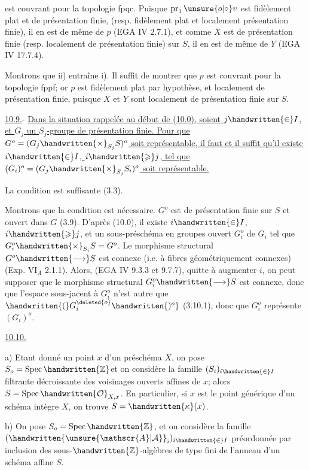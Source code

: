 est couvrant pour la topologie fpqc. Puisque $\operatorname{pr}_1\mathbin{\unsure{o|\circ}} v$ est fidèlement plat et de présentation finie, (resp. fidèlement plat et localement  présentation finie), il en est de même de $p$ (EGA IV 2.7.1), et comme $X$ est de présentation finie (resp. localement de présentation finie) sur $S$, il en est de même de $Y$ (EGA IV 17.7.4).

Montrons que ii) entraîne i). Il suffit de montrer que $p$ est couvrant pour la topologie fppf; or $p$ est fidèlement plat par hypothèse, et localement de présentation finie, puisque $X$ et $Y$ sont localement de présentation finie sur $S$.

\uline{10.9.}- \uline{Dans la situation rappelée au début de (10.0), soient $j\handwritten{\in}I$, et $G_j$ un $S_j$-groupe de présentation finie. Pour que $G^o=(G_j\handwritten{\times}_{S_j}S)^o$ soit représentable, il faut et il suffit qu'il existe  $i\handwritten{\in}I$, $i\handwritten{\geqslant}j$, tel que $(G_i)^o=(G_j\handwritten{\times}_{S_j}S_i)^o$ soit représentable.}

La condition est suffisante (3.3).

Montrons que la condition est nécessaire.  $G^o$ est de présentation finie sur $S$ et ouvert dans $G$ (3.9). D'après (10.0), il existe $i\handwritten{\in}I$, $i\handwritten{\geqslant}j$, et un sous-préschéma en groupes ouvert $G_i^o$ de $G_i$ tel que $G_i^o\handwritten{\times}_{S_i}S=G^o$. Le morphisme structural $G^o\handwritten{\longrightarrow}S$ est connexe (i.e. à fibres géométriquement connexes)(Exp. $\mathrm{VI}_A$ 2.1.1). Alors, (EGA IV 9.3.3 et 9.7.7), quitte à augmenter $i$, on peut supposer que le morphisme structural $G_i^o\handwritten{\longrightarrow}S$ est connexe, donc que l'espace sous-jacent à $G_i^o$ n'est autre que \uline{$\handwritten{(}G_i^{\deleted{o}}\handwritten{)^o}$} (3.10.1), donc que $G_i^o$ représente $(G_i)^o$.

\uline{10.10.} 

a) Etant donné un point $x$ d'un préschéma $X$, on pose $S_o=\operatorname{Spec}\handwritten{\mathbb{Z}}$\handwritten{/}et on considère la famille $(S_i)_{i\handwritten{\in}I}$ filtrante décroissante des voisinages  ouverts affines de $x$; alors $S=\operatorname{Spec}\handwritten{\mathcal{O}}_{X,x}$. En particulier, si $x$ est le point générique d'un schéma intègre $X$, on trouve $S=\handwritten{\kappa}(x)$.

b) On pose $S_o=\operatorname{Spec}\handwritten{\mathbb{Z}}$, et on considère la famille $(\handwritten{\unsure{\mathscr{A}|\mathcal{A}}}_i)_{i\handwritten{\in}I}$ préordonnée par inclusion des sous-$\handwritten{\mathbb{Z}}$-algèbres de type fini de l'anneau d'un schéma affine $S$.
